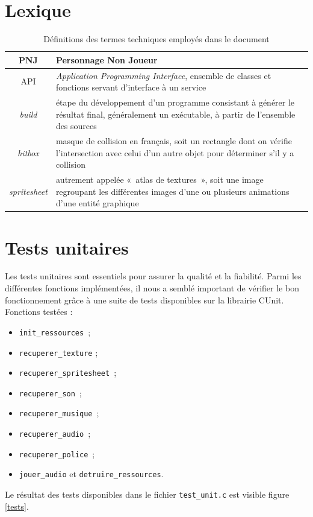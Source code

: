 \documentclass[a4paper,12pt]{article}
\begin{document}
\newpage
\begin{appendices}

\section{Lexique}

\begin{table}[h]
    \centering
    \begin{tabular}{c p{}}
	\toprule
        PNJ \label{def_pnj} & Personnage Non Joueur \\
	\midrule
	API \label{def_api} & \textit{Application Programming Interface}, ensemble de classes et fonctions servant d’interface à un service \\
	\midrule
        \textit{build} \label{def_build} & étape du développement d’un programme consistant à générer le résultat final, généralement un exécutable, à partir de l’ensemble des sources \\
	\midrule
        \textit{hitbox} \label{def_hitbox} & masque de collision en français, soit un rectangle dont on vérifie l’intersection avec celui d’un autre objet pour déterminer s’il y a collision\\
	\midrule
        \textit{spritesheet} \label{def_spritesheet} & autrement appelée « atlas de textures », soit une image regroupant les différentes images d’une ou plusieurs animations d’une entité graphique \\
	\bottomrule
    \end{tabular}
    \caption{Définitions des termes techniques employés dans le document}
\end{table}



\section{Tests unitaires}
Les tests unitaires sont essentiels pour assurer la qualité et la fiabilité. Parmi les différentes fonctions implémentées, il nous a semblé important de vérifier le bon fonctionnement grâce à une suite de tests disponibles sur la librairie CUnit.\\
Fonctions testées :
\begin{itemize}
	\item \texttt{init\_ressources} ;
	\item \texttt{recuperer\_texture} ;
	\item \texttt{recuperer\_spritesheet} ;
	\item \texttt{recuperer\_son} ;
	\item \texttt{recuperer\_musique} ;
	\item \texttt{recuperer\_audio} ;
	\item \texttt{recuperer\_police} ;
	\item \texttt{jouer\_audio} et \texttt{detruire\_ressources}.
\end{itemize}
Le résultat des tests disponibles dans le fichier \texttt{test\_unit.c} est visible figure \ref{tests}.


\end{appendices}
\end{document}
